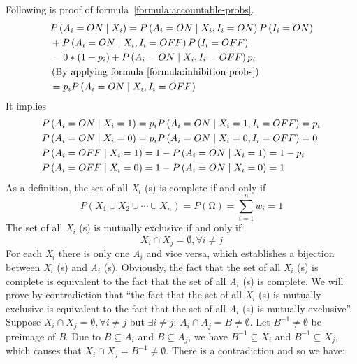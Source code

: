 \documentclass{article}
\numberwithin{equation}{section}
\numberwithin{figure}{section}
\numberwithin{table}{section}
\begin{document}
Following is proof of formula~\ref{formula:accountable-probs}.
\begin{align*}
&P\left(A_i=ON\mathrel{\left|\vphantom{A_i=ON X_i}\right.\kern-\nulldelimiterspace}X_i\right)=P\left(A_i=ON\mathrel{\left|\vphantom{A_i=ON X_i,I_i=ON}\right.\kern-\nulldelimiterspace}X_i,I_i=ON\right)P\left(I_i=ON\right)\\
&+P\left(A_i=ON\mathrel{\left|\vphantom{A_i=ON X_i,I_i=OFF}\right.\kern-\nulldelimiterspace}X_i,I_i=OFF\right)P\left(I_i=OFF\right)\\
&=0*\left(1-p_i\right)+P\left(A_i=ON\mathrel{\left|\vphantom{A_i=ON X_i,I_i=OFF}\right.\kern-\nulldelimiterspace}X_i,I_i=OFF\right)p_i\\
&\left(\mathrm{By\ applying\ formula\ \ref{formula:inhibition-probs}}\right)\\
&=p_iP\left(A_i=ON\mathrel{\left|\vphantom{A_i=ON X_i,I_i=OFF}\right.\kern-\nulldelimiterspace}X_i,I_i=OFF\right)
\end{align*}
It implies
\begin{align*}
&P\left(A_i=ON\mathrel{\left|\vphantom{A_i=ON X_i=1}\right.\kern-\nulldelimiterspace}X_i=1\right)=p_iP\left(A_i=ON\mathrel{\left|\vphantom{A_i=ON X_i=1,I_i=OFF}\right.\kern-\nulldelimiterspace}X_i=1,I_i=OFF\right)=p_i\\
&P\left(A_i=ON\mathrel{\left|\vphantom{A_i=ON X_i=0}\right.\kern-\nulldelimiterspace}X_i=0\right)=p_iP\left(A_i=ON\mathrel{\left|\vphantom{A_i=ON X_i=0,I_i=OFF}\right.\kern-\nulldelimiterspace}X_i=0,I_i=OFF\right)=0\\
&P\left(A_i=OFF\mathrel{\left|\vphantom{A_i=OFF X_i=1}\right.\kern-\nulldelimiterspace}X_i=1\right)=1-P\left(A_i=ON\mathrel{\left|\vphantom{A_i=ON X_i=1}\right.\kern-\nulldelimiterspace}X_i=1\right)=1-p_i\\
&P\left(A_i=OFF\mathrel{\left|\vphantom{A_i=OFF X_i=0}\right.\kern-\nulldelimiterspace}X_i=0\right)=1-P\left(A_i=ON\mathrel{\left|\vphantom{A_i=ON X_i=0}\right.\kern-\nulldelimiterspace}X_i=0\right)=1
\end{align*}
As a definition, the set of all \textit{X${}_{i}$} (s) is complete if and only if
\[P\left(X_1\cup X_2\cup \cdots \cup X_n\right)=P\left(\mathrm{\Omega }\right)=\sum^n_{i=1}{w_i}=1\] 
The set of all \textit{X${}_{i}$} (s) is mutually exclusive if and only if
\[X_i\cap X_j=\emptyset ,\forall i\neq j\] 
For each \textit{X${}_{i}$} there is only one \textit{A${}_{i}$} and vice versa, which establishes a bijection between \textit{X${}_{i}$} (s) and \textit{A${}_{i}$} (s). Obviously, the fact that the set of all \textit{X${}_{i}$} (s) is complete is equivalent to the fact that the set of all \textit{A${}_{i}$} (s) is complete. We will prove by contradiction that ``the fact that the set of all \textit{X${}_{i}$} (s) is mutually exclusive is equivalent to the fact that the set of all \textit{A${}_{i}$} (s) is mutually exclusive''. Suppose $X_i\cap X_j=\emptyset ,\forall i\neq j$ but $\exists i\neq j$: $A_i\cap A_j=B\neq \emptyset $. Let $B^{-1}\neq \emptyset $ be preimage of \textit{B}. Due to $B\subseteq A_i$ and $B\subseteq A_j$, we have $B^{-1}\subseteq X_i$ and $B^{-1}\subseteq X_j$, which causes that $X_i\cap X_j=B^{-1}\neq \emptyset $. There is a contradiction and so we have:
\end{document}
